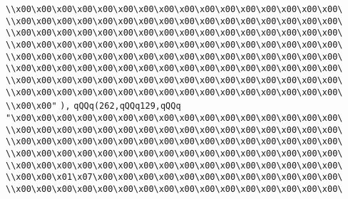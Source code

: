 \verb|\\x00\x00\x00\x00\x00\x00\x00\x00\x00\x00\x00\x00\x00\x00\x00\x00\|\newline
\verb|\\x00\x00\x00\x00\x00\x00\x00\x00\x00\x00\x00\x00\x00\x00\x00\x00\|\newline
\verb|\\x00\x00\x00\x00\x00\x00\x00\x00\x00\x00\x00\x00\x00\x00\x00\x00\|\newline
\verb|\\x00\x00\x00\x00\x00\x00\x00\x00\x00\x00\x00\x00\x00\x00\x00\x00\|\newline
\verb|\\x00\x00\x00\x00\x00\x00\x00\x00\x00\x00\x00\x00\x00\x00\x00\x00\|\newline
\verb|\\x00\x00\x00\x00\x00\x00\x00\x00\x00\x00\x00\x00\x00\x00\x00\x00\|\newline
\verb|\\x00\x00\x00\x00\x00\x00\x00\x00\x00\x00\x00\x00\x00\x00\x00\x00\|\newline
\verb|\\x00\x00\x00\x00\x00\x00\x00\x00\x00\x00\x00\x00\x00\x00\x00\x00\|\newline
\verb|\\x00\x00"|\newline
\verb|),|\newline
\verb|qQQq(262,qQQq129,qQQq|\newline
\verb|"\x00\x00\x00\x00\x00\x00\x00\x00\x00\x00\x00\x00\x00\x00\x00\x00\|\newline
\verb|\\x00\x00\x00\x00\x00\x00\x00\x00\x00\x00\x00\x00\x00\x00\x00\x00\|\newline
\verb|\\x00\x00\x00\x00\x00\x00\x00\x00\x00\x00\x00\x00\x00\x00\x00\x00\|\newline
\verb|\\x00\x00\x00\x00\x00\x00\x00\x00\x00\x00\x00\x00\x00\x00\x00\x00\|\newline
\verb|\\x00\x00\x00\x00\x00\x00\x00\x00\x00\x00\x00\x00\x00\x00\x00\x00\|\newline
\verb|\\x00\x00\x01\x07\x00\x00\x00\x00\x00\x00\x00\x00\x00\x00\x00\x00\|\newline
\verb|\\x00\x00\x00\x00\x00\x00\x00\x00\x00\x00\x00\x00\x00\x00\x00\x00\|\newline
